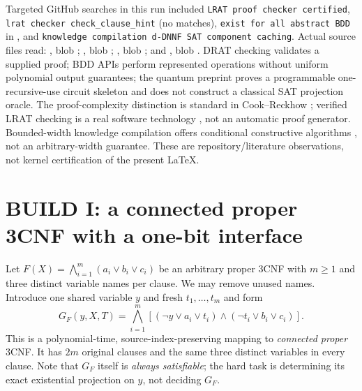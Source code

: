 \documentclass[11pt]{article}
\begin{document}
Targeted GitHub searches in this run included \texttt{LRAT proof checker certified}, \texttt{lrat checker check\_clause\_hint} (no matches), \texttt{exist for all abstract BDD} in , and \texttt{knowledge compilation d-DNNF SAT component caching}. Actual source files read: , blob ; , blob ; , blob ; and , blob . DRAT checking validates a supplied proof; BDD APIs perform represented operations without uniform polynomial output guarantees; the quantum preprint proves a programmable one-recursive-use circuit skeleton and does not construct a classical SAT projection oracle. The proof-complexity distinction is standard in Cook--Reckhow \cite{cookreckhow}; verified LRAT checking is a real software technology \cite{lrat}, not an automatic proof generator. Bounded-width knowledge compilation offers conditional constructive algorithms \cite{amarilli,capelli}, not an arbitrary-width guarantee. These are repository/literature observations, not kernel certification of the present LaTeX.

\section{BUILD I: a connected proper 3CNF with a one-bit interface}
Let $F(X)=\bigwedge_{i=1}^{m}(a_i\vee b_i\vee c_i)$ be an arbitrary proper 3CNF with $m\ge1$ and three distinct variable names per clause. We may remove unused names. Introduce one shared variable $y$ and fresh $t_1,\ldots,t_m$ and form
\begin{equation}\label{eq:lift}
G_F(y,X,T)=\bigwedge_{i=1}^{m}\left[(\neg y\vee a_i\vee t_i)\wedge(\neg t_i\vee b_i\vee c_i)\right].
\end{equation}
This is a polynomial-time, source-index-preserving mapping to \emph{connected proper} 3CNF. It has $2m$ original clauses and the same three distinct variables in every clause. Note that $G_F$ itself is \emph{always satisfiable}; the hard task is determining its exact existential projection on $y$, not deciding $G_F$.
\end{document}
